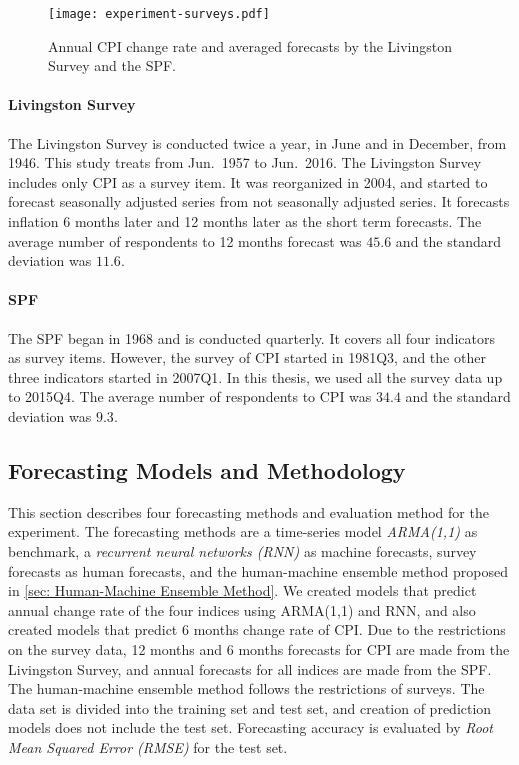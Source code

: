 \documentclass[../main.tex]{subfiles}
\begin{document}
\begin{figure}
  \centering
  \texttt{[image: experiment-surveys.pdf]}
  \caption{
    Annual CPI change rate and averaged forecasts by the Livingston Survey and the SPF\@.
  }\label{fig: survey forecasts}
\end{figure}

\paragraph{Livingston Survey}

The Livingston Survey is conducted twice a year, in June and in December, from 1946.
This study treats from Jun.\ 1957 to Jun.\ 2016.
The Livingston Survey includes only CPI as a survey item.
It was reorganized in 2004, and started to forecast seasonally adjusted series from not seasonally adjusted series.
It forecasts inflation 6 months later and 12 months later as the short term forecasts.
The average number of respondents to 12 months forecast was $45.6$ and the standard deviation was $11.6$.

\paragraph{SPF}

The SPF began in 1968 and is conducted quarterly.  It covers all four indicators as survey items.
However, the survey of CPI started in 1981Q3, and the other three indicators started in 2007Q1.
In this thesis, we used all the survey data up to 2015Q4.
The average number of respondents to CPI was $34.4$ and the standard deviation was $9.3$.

\subsection{Forecasting Models and Methodology}
\label{sub: Forecasting Models and Methodology}

This section describes four forecasting methods and evaluation method for the experiment.
The forecasting methods are a time-series model \emph{ARMA(1,1)} as benchmark, a \emph{recurrent neural networks (RNN)} as machine forecasts, survey forecasts as human forecasts, and the human-machine ensemble method proposed in \ref{sec: Human-Machine Ensemble Method}.
We created models that predict annual change rate of the four indices using ARMA(1,1) and RNN, and also created models that predict 6 months change rate of CPI\@.
Due to the restrictions on the survey data, 12 months and 6 months forecasts for CPI are made from the Livingston Survey, and annual forecasts for all indices are made from the SPF\@.
The human-machine ensemble method follows the restrictions of surveys.
The data set is divided into the training set and test set, and creation of prediction models does not include the test set.
Forecasting accuracy is evaluated by \emph{Root Mean Squared Error (RMSE)} for the test set.
\end{document}
